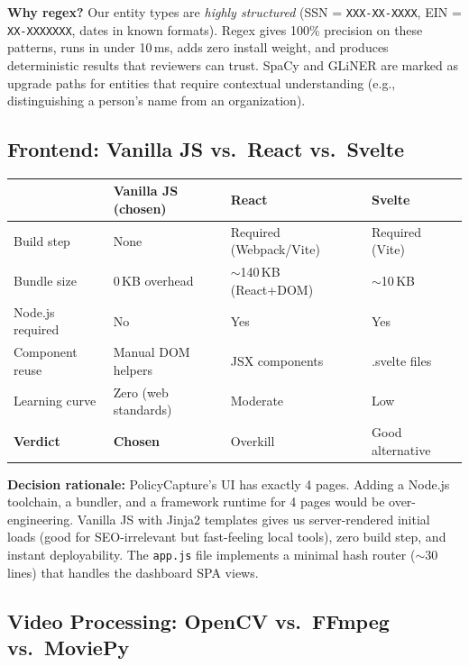 \documentclass[12pt, a4paper]{article}
\newcommand{\codeinline}[1]{\texttt{\small\colorbox{codebg}{#1}}}
\begin{document}
\textbf{Why regex?} Our entity types are \textit{highly structured} (SSN = \codeinline{XXX-XX-XXXX}, EIN = \codeinline{XX-XXXXXXX}, dates in known formats). Regex gives 100\% precision on these patterns, runs in under 10\,ms, adds zero install weight, and produces deterministic results that reviewers can trust. SpaCy and GLiNER are marked as upgrade paths for entities that require contextual understanding (e.g., distinguishing a person's name from an organization).

\subsection{Frontend: Vanilla JS vs.\ React vs.\ Svelte}

\begin{longtable}{@{} p{3cm} p{4cm} p{3.5cm} p{3.5cm} @{}}
    \toprule
    & \textbf{Vanilla JS (chosen)} & \textbf{React} & \textbf{Svelte} \\
    \midrule
    Build step & None & Required (Webpack/Vite) & Required (Vite) \\
    Bundle size & 0\,KB overhead & $\sim$140\,KB (React+DOM) & $\sim$10\,KB \\
    Node.js required & No & Yes & Yes \\
    Component reuse & Manual DOM helpers & JSX components & .svelte files \\
    Learning curve & Zero (web standards) & Moderate & Low \\
    \midrule
    \textbf{Verdict} & \textcolor{acceptgreen}{\textbf{Chosen}} & Overkill & Good alternative \\
    \bottomrule
\end{longtable}

\textbf{Decision rationale:} PolicyCapture's UI has exactly 4 pages. Adding a Node.js toolchain, a bundler, and a framework runtime for 4 pages would be over-engineering. Vanilla JS with Jinja2 templates gives us server-rendered initial loads (good for SEO-irrelevant but fast-feeling local tools), zero build step, and instant deployability. The \codeinline{app.js} file implements a minimal hash router ($\sim$30 lines) that handles the dashboard SPA views.

\subsection{Video Processing: OpenCV vs.\ FFmpeg vs.\ MoviePy}
\end{document}
